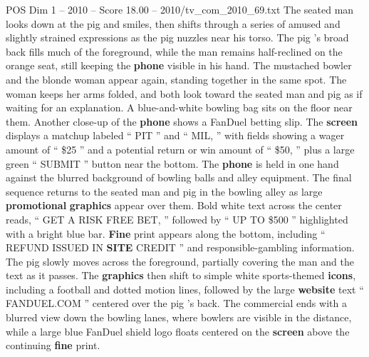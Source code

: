 \begin{textsample}{POS Dim 1 – 2010 – Score 18.00 – 2010/tv\_com\_2010\_69.txt}
The seated man looks down at the pig and smiles, then shifts through a series of amused and slightly strained expressions as the pig nuzzles near his torso.
The pig ’s broad back fills much of the foreground, while the man remains half-reclined on the orange seat, still keeping the \textbf{phone} visible in his hand.
The mustached bowler and the blonde woman appear again, standing together in the same spot.
The woman keeps her arms folded, and both look toward the seated man and pig as if waiting for an explanation.
A blue-and-white bowling bag sits on the floor near them.
Another close-up of the \textbf{phone} shows a FanDuel betting slip.
The \textbf{screen} displays a matchup labeled “ PIT ” and “ MIL, ” with fields showing a wager amount of “ \$25 ” and a potential return or win amount of “ \$50, ” plus a large green “ SUBMIT ” button near the bottom.
The \textbf{phone} is held in one hand against the blurred background of bowling balls and alley equipment.
The final sequence returns to the seated man and pig in the bowling alley as large \textbf{promotional} \textbf{graphics} appear over them.
Bold white text across the center reads, “ GET A RISK FREE BET, ” followed by “ UP TO \$500 ” highlighted with a bright blue bar. \textbf{Fine} print appears along the bottom, including “ REFUND ISSUED IN \textbf{SITE} CREDIT ” and responsible-gambling information.
The pig slowly moves across the foreground, partially covering the man and the text as it passes.
The \textbf{graphics} then shift to simple white sports-themed \textbf{icons}, including a football and dotted motion lines, followed by the large \textbf{website} text “ FANDUEL.COM ” centered over the pig ’s back.
The commercial ends with a blurred view down the bowling lanes, where bowlers are visible in the distance, while a large blue FanDuel shield logo floats centered on the \textbf{screen} above the continuing \textbf{fine} print.

\end{textsample}
